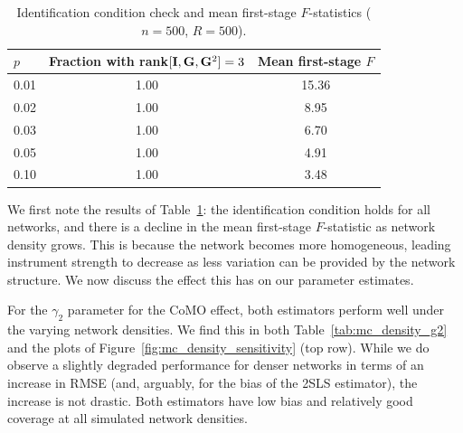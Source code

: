 \begin{table}[htbp]
\centering
\caption[Identification condition check and mean first-stage $F$-statistics]{Identification condition check and mean first-stage $F$-statistics ($n = 500$, $R = 500$).}
\label{tab:mc_identification}
\begin{tabular}{lcc}
\toprule
$p$ & Fraction with rank$[\mathbf{I}, \mathbf{G}, \mathbf{G}^2] = 3$ & Mean first-stage $F$ \\
\midrule
0.01 & 1.00 & 15.36 \\
0.02 & 1.00 & 8.95 \\
0.03 & 1.00 & 6.70 \\
0.05 & 1.00 & 4.91 \\
0.10 & 1.00 & 3.48 \\
\bottomrule
\end{tabular}
\end{table}

We first note the results of Table~\ref{tab:mc_identification}: the identification condition holds for all networks, and there is a decline in the mean first-stage $F$-statistic as network density grows. This is because the network becomes more homogeneous, leading instrument strength to decrease as less variation can be provided by the network structure. We now discuss the effect this has on our parameter estimates.

For the $\gamma_2$ parameter for the CoMO effect, both estimators perform well under the varying network densities. We find this in both Table~\ref{tab:mc_density_g2} and the plots of Figure~\ref{fig:mc_density_sensitivity} (top row). While we do observe a slightly degraded performance for denser networks in terms of an increase in RMSE (and, arguably, for the bias of the 2SLS estimator), the increase is not drastic. Both estimators have low bias and relatively good coverage at all simulated network densities.

